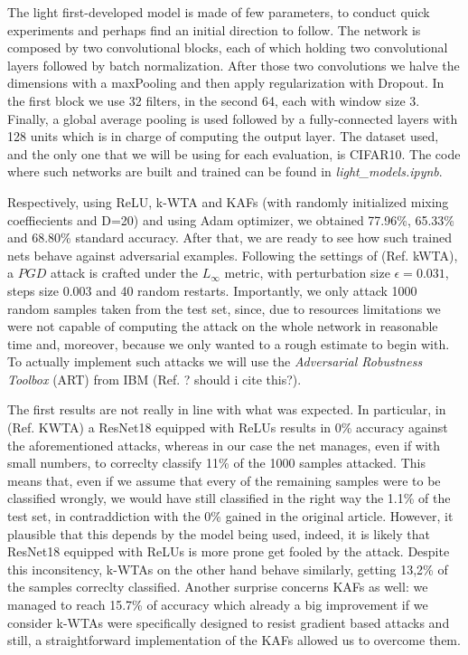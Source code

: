 \documentclass[LaM,binding=0.6cm]{./packages/sapthesis/sapthesis}
\begin{document}
        The light first-developed model is made of few parameters, to conduct quick experiments and perhaps find an initial direction to follow. The network 
        is composed by two convolutional blocks, each of which holding two convolutional layers followed by batch normalization. After those two convolutions we 
        halve the dimensions with a maxPooling and then apply regularization with Dropout. In the first block we use 32 filters, in the second 64, each with window 
        size 3. Finally, a global average pooling is used followed by a fully-connected layers with 128 units which is in charge of computing the output layer.
        The dataset used, and the only one that we will be using for each evaluation, is CIFAR10. The code where such networks are built and trained can be found in 
        \textit{light\_models.ipynb}.

        Respectively, using ReLU, k-WTA and KAFs (with randomly initialized mixing coeffiecients and D=20) and using Adam optimizer, we obtained 77.96\%, 65.33\%
        and 68.80\% standard accuracy. After that, we are ready to see how such trained nets behave against adversarial examples. Following the settings of 
        (Ref. kWTA), a $PGD$ attack is crafted under the $L_{\infty}$ metric, with perturbation size $\epsilon = 0.031$, steps size $0.003$ and 40 random 
        restarts. Importantly, we only attack 1000 random samples taken from the test set, since, due to resources limitations we were not capable of computing 
        the attack on the whole network in reasonable time and, moreover, because we only wanted to a rough estimate to begin with. To actually implement such attacks we 
        will use the \textit{Adversarial Robustness Toolbox} (ART) from IBM (Ref. ? should i cite this?).

        The first results are not really in line with what was expected. In particular, in (Ref. KWTA) a ResNet18 equipped with ReLUs results in 0\% accuracy 
        against the aforementioned attacks, whereas in our case the net manages, even if with small numbers, to correclty classify 11\% of the 1000 samples 
        attacked. This means that, even if we assume that every of the remaining samples were to be classified wrongly, we would have still classified in the 
        right way the 1.1\% of the test set, in contraddiction with the 0\% gained in the original article. However, it plausible that this depends by the model 
        being used, indeed, it is likely that ResNet18 equipped with ReLUs is more prone get fooled by the attack. Despite this inconsitency, k-WTAs on the other 
        hand behave similarly, getting 13,2\% of the samples correclty classified. Another surprise concerns KAFs as well: we managed to reach 15.7\% of accuracy 
        which already a big improvement if we consider k-WTAs were specifically designed to resist gradient based attacks and still, a straightforward implementation 
        of the KAFs allowed us to overcome them.
        
\end{document}
